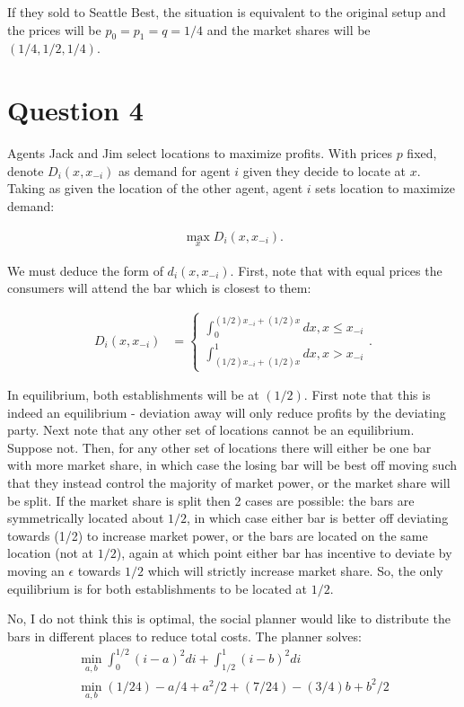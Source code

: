\documentclass[11pt]{article} %
\begin{document}
If they sold to Seattle Best, the situation is equivalent to the original setup and the prices will be $p_0 = p_1 = q = 1/4$ and the market shares will be $(1/4,1/2,1/4)$. 

\section{Question 4}
Agents Jack and Jim select locations to maximize profits. With prices $p$ fixed, denote $D_i(x,x_{-i})$ as demand for agent $i$ given they decide to locate at $x$. Taking as given the location of the other agent, agent $i$ sets location to maximize demand:

\begin{align*}
\max_{x}D_i(x,x_{-i}).
\end{align*}

We must deduce the form of $d_i(x,x_{-i})$. First, note that with equal prices the consumers will attend the bar which is closest to them:

\begin{align*}
D_i(x,x_{-i}) &= \begin{cases} \int_{0}^{(1/2)x_{-i} + (1/2) x } dx, x\leq x_{-i}\\ \int_{(1/2)x_{-i} + (1/2) x }^{1} dx, x>x_{-i}  \end{cases}.
\end{align*}

In equilibrium, both establishments will be at $(1/2)$. First note that this is indeed an equilibrium - deviation away will only reduce profits by the deviating party. Next note that any other set of locations cannot be an equilibrium. Suppose not. Then, for any other set of locations there will either be one bar with more market share, in which case the losing bar will be best off moving such that they instead control the majority of market power, or the market share will be split. If the market share is split then 2 cases are possible: the bars are symmetrically located about $1/2$, in which case either bar is better off deviating towards (1/2) to increase market power, or the bars are located on the same location (not at $1/2$), again at which point either bar has incentive to deviate by moving an $\epsilon$ towards $1/2$ which will strictly increase market share. So, the only equilibrium is for both establishments to be located at $1/2$.

No, I do not think this is optimal, the social planner would like to distribute the bars in different places to reduce total costs. The planner solves:
\begin{align*}
\min_{a,b}\int_{0}^{1/2}(i-a)^2di + \int_{1/2}^1 (i-b)^2 di \\
\min_{a,b}(1/24) - a/4 + a^2/2 + (7/24) - (3/4)b + b^2/2 \\
\end{align*}
\end{document}
